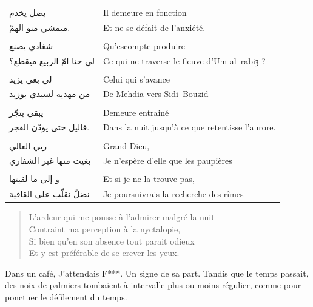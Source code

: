 \begin{longtable}{R{0.3\textwidth} L{0.65\textwidth}}
\\
\textarabic{يضل يخدم}                    &       Il demeure en fonction   \\
\textarabic{ميمشي منو الهمّ.}             &       Et ne se défait de l’anxiété.   \\
\\
\textarabic{شغادي يصنع}                  &       Qu’escompte produire   \\
\textarabic{لي حتا امّ الربيع ميقطع؟}     &       Ce qui ne traverse le fleuve d’Um al~rabiȝ ?   \\
\\
\textarabic{لي بغي يزيد}                 &       Celui qui s’avance   \\
\textarabic{من مهديه لسيدي بوزيد}        &       De Mehdia vers Sidi~Bouzid \\
\\
\textarabic{يبقى يتجّر}                   &       Demeure entrainé   \\
\textarabic{فاليل حتى يودّن الفجر.}       &       Dans la nuit jusqu’à ce que retentisse  l’aurore.   \\
\\
\textarabic{ربي العالي}                  &       Grand Dieu,   \\
\textarabic{بغيت منها غير الشفاري}       &       Je n’espère d’elle que les paupières   \\
\\
\textarabic{و إلى ما لقيتها}             &       Et si je ne la trouve pas,   \\
\textarabic{نضلّ نقلّب على القافية}        &       Je poursuivrais la recherche des rîmes   \\
\end{longtable}

\begin{verse}
L’ardeur qui me pousse à l’admirer malgré la nuit\\
Contraint ma perception à la nyctalopie,\\
Si bien qu’en son absence tout parait odieux\\
Et y est préférable de se crever les yeux.
\end{verse}

\begin{prose}
Dans un café, J’attendais F***. Un signe de sa part. Tandis que le temps passait, des noix de palmiers tombaient à intervalle plus ou moins régulier, comme pour ponctuer le défilement du temps.
\end{prose}

